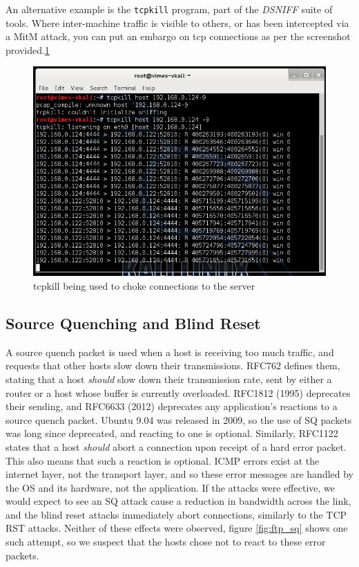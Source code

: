 An alternative example is the {\tt tcpkill} program, part of the \emph{DSNIFF} suite of tools. Where inter-machine
traffic is visible to others, or has been intercepted via a MitM attack, you can put an embargo on tcp connections as
per the screenshot provided.\ref{fig:tcpkill}

\begin{figure}[h]
    \centering
    \includegraphics[width=.5\linewidth]{images/tcpkill.png}
    \caption{tcpkill being used to choke connections to the server}
    \label{fig:tcpkill}
\end{figure}

\subsection{Source Quenching and Blind Reset}

A source quench packet is used when a host is receiving too much traffic, and requests that other hosts slow down their
transmissions. RFC762\cite{rfc0762} defines them, stating that a host \emph{should} slow down their transmission rate, sent by either
a router or a host whose buffer is currently overloaded. RFC1812\cite{rfc1812} (1995) deprecates their sending, and RFC6633\cite{rfc6633} (2012)
deprecates any application's reactions to a source quench packet. Ubuntu 9.04 was released in 2009, so the use of SQ
packets was long since deprecated, and reacting to one is optional. Similarly, RFC1122\cite{rfc1122} states that a host \emph{should}
abort a connection upon receipt of a hard error packet. This also means that such a reaction is optional. ICMP errors
exist at the internet layer, not the transport layer, and so these error messages are handled by the OS and its
hardware, not the application. If the attacks were effective, we would expect to see an SQ attack cause a reduction in
bandwidth across the link, and the blind reset attacks immediately abort connections, similarly to the TCP RST attacks.
Neither of these effects were observed, figure \ref{fig:ftp_sq} shows one such attempt, so we suspect that the hosts
chose not to react to these error packets.

